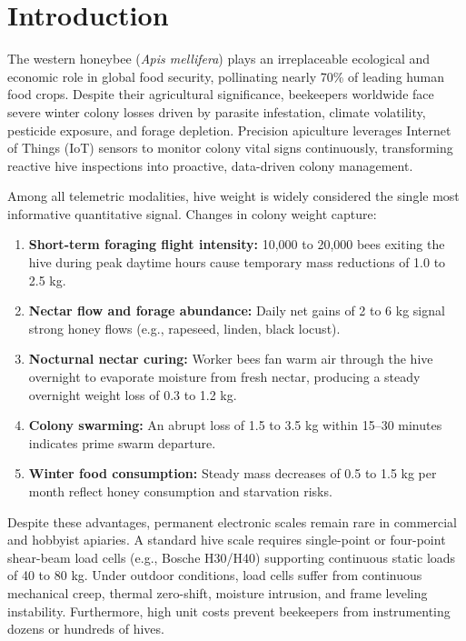 \documentclass[10pt,twocolumn]{article}
\begin{document}
\section{Introduction}
The western honeybee (\textit{Apis mellifera}) plays an irreplaceable ecological and economic role in global food security, pollinating nearly 70\% of leading human food crops. Despite their agricultural significance, beekeepers worldwide face severe winter colony losses driven by parasite infestation, climate volatility, pesticide exposure, and forage depletion. Precision apiculture leverages Internet of Things (IoT) sensors to monitor colony vital signs continuously, transforming reactive hive inspections into proactive, data-driven colony management.

Among all telemetric modalities, hive weight is widely considered the single most informative quantitative signal. Changes in colony weight capture:
\begin{enumerate}
    \item \textbf{Short-term foraging flight intensity:} 10,000 to 20,000 bees exiting the hive during peak daytime hours cause temporary mass reductions of 1.0 to 2.5 kg.
    \item \textbf{Nectar flow and forage abundance:} Daily net gains of 2 to 6 kg signal strong honey flows (e.g., rapeseed, linden, black locust).
    \item \textbf{Nocturnal nectar curing:} Worker bees fan warm air through the hive overnight to evaporate moisture from fresh nectar, producing a steady overnight weight loss of 0.3 to 1.2 kg.
    \item \textbf{Colony swarming:} An abrupt loss of 1.5 to 3.5 kg within 15--30 minutes indicates prime swarm departure.
    \item \textbf{Winter food consumption:} Steady mass decreases of 0.5 to 1.5 kg per month reflect honey consumption and starvation risks.
\end{enumerate}

Despite these advantages, permanent electronic scales remain rare in commercial and hobbyist apiaries. A standard hive scale requires single-point or four-point shear-beam load cells (e.g., Bosche H30/H40) supporting continuous static loads of 40 to 80 kg. Under outdoor conditions, load cells suffer from continuous mechanical creep, thermal zero-shift, moisture intrusion, and frame leveling instability. Furthermore, high unit costs prevent beekeepers from instrumenting dozens or hundreds of hives.
\end{document}
